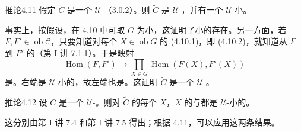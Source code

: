 \begin{SGAresult}{推论}{4.11}
假定 $C$ 是一个 $\mathcal U$-（3.0.2）。则 $\widetilde C$ 是 $\mathcal U$-，并有一个 $\mathcal U$-小。
\end{SGAresult}
事实上，按假设，在 4.10 中可取 $G$ 为小，这证明了小的存在。另一方面，若 $F,F'\in\operatorname{ob}\mathscr C$，只要知道对每个 $X\in\operatorname{ob}G$ 的 (4.10.1)，即 (4.10.2)，就知道从 $F$ 到 $F'$ 的（第 I 讲 7.1.1）。于是映射
\[\operatorname{Hom}(F,F')\longrightarrow\prod_{X\in G}\operatorname{Hom}(F(X),F'(X))\]
是。右端是 $\mathcal U$-小的，故左端也是。这证明 $\widetilde C$ 是一个 $\mathcal U$-。
\begin{SGAresult}{推论}{4.12}
设 $C$ 是一个 $\mathcal U$-。则对 $\widetilde C$ 的每个 $X$，$X$ 的与都是 $\mathcal U$-小的。
\end{SGAresult}
这分别由第 I 讲 7.4 和第 I 讲 7.5 得出；根据 4.11，可以应用这两条结果。

